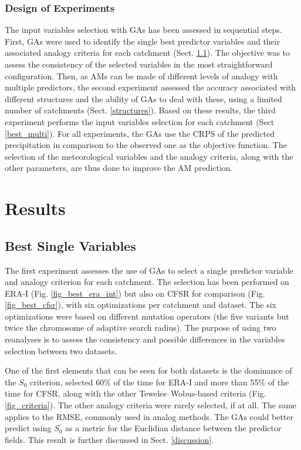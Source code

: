 \documentclass[draft]{agujournal2019}
\begin{document}
\subsubsection{Design of Experiments}
\label{experiments}

The input variables selection with GAs has been assessed in sequential steps. First, GAs were used to identify the single best predictor variables and their associated analogy criteria for each catchment (Sect. \ref{best_single}). The objective was to assess the consistency of the selected variables in the most straightforward configuration. Then, as AMs can be made of different levels of analogy with multiple predictors, the second experiment assessed the accuracy associated with different structures and the ability of GAs to deal with these, using a limited number of catchments (Sect. \ref{structures}). Based on these results, the third experiment performs the input variables selection for each catchment (Sect \ref{best_multi}). For all experiments, the GAs use the CRPS of the predicted precipitation in comparison to the observed one as the objective function. The selection of the meteorological variables and the analogy criteria, along with the other parameters, are thus done to improve the AM prediction.


\section{Results}
\label{results}

\subsection{Best Single Variables}
\label{best_single}

The first experiment assesses the use of GAs to select a single predictor variable and analogy criterion for each catchment. The selection has been performed on ERA-I (Fig. \ref{fig_best_era_int}) but also on CFSR for comparison (Fig. \ref{fig_best_cfsr}), with six optimizations per catchment and dataset. The six optimizations were based on different mutation operators (the five variants but twice the chromosome of adaptive search radius). The purpose of using two reanalyses is to assess the consistency and possible differences in the variables selection between two datasets.

One of the first elements that can be seen for both datasets is the dominance of the $S_{0}$ criterion, selected 60\% of the time for ERA-I and more than 55\% of the time for CFSR, along with the other Teweles--Wobus-based criteria (Fig. \ref{fig_criteria}). The other analogy criteria were rarely selected, if at all. The same applies to the RMSE, commonly used in analog methods. The GAs could better predict using $S_{0}$ as a metric for the Euclidian distance between the predictor fields. This result is further discussed in Sect. \ref{discussion}.
\end{document}
